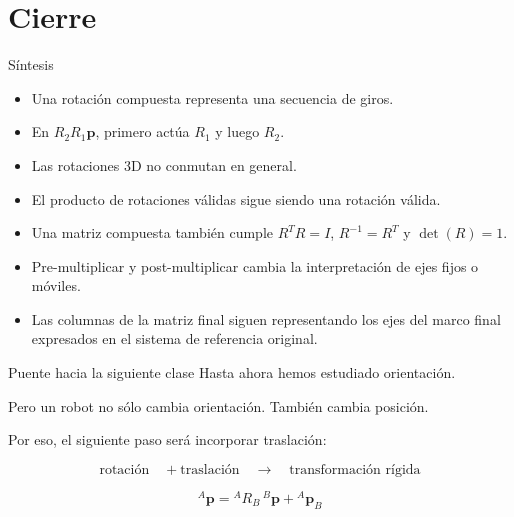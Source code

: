 \documentclass[aspectratio=169,10pt]{beamer}
\begin{document}
\section{Cierre}

\begin{frame}{Síntesis}
    \small
    \begin{itemize}
        \item Una rotación compuesta representa una secuencia de giros.
        \item En $R_2R_1\boldsymbol{p}$, primero actúa $R_1$ y luego $R_2$.
        \item Las rotaciones 3D no conmutan en general.
        \item El producto de rotaciones válidas sigue siendo una rotación válida.
        \item Una matriz compuesta también cumple $R^TR=I$, $R^{-1}=R^T$ y $\det(R)=1$.
        \item Pre-multiplicar y post-multiplicar cambia la interpretación de ejes fijos o móviles.
        \item Las columnas de la matriz final siguen representando los ejes del marco final expresados en el sistema de referencia original.
    \end{itemize}
\end{frame}

\begin{frame}{Puente hacia la siguiente clase}
    \small
    Hasta ahora hemos estudiado orientación.

    \vspace{0.15cm}
    Pero un robot no sólo cambia orientación. También cambia posición.

    \vspace{0.15cm}
    Por eso, el siguiente paso será incorporar traslación:

    \[
    \text{rotación}
    \quad+
    \text{traslación}
    \quad\rightarrow\quad
    \text{transformación rígida}
    \]

    \[
    \boxed{
    {}^A\boldsymbol{p}= {}^AR_B\,{}^B\boldsymbol{p}+{}^A\boldsymbol{p}_{B}}
    \]

\end{frame}
\end{document}

